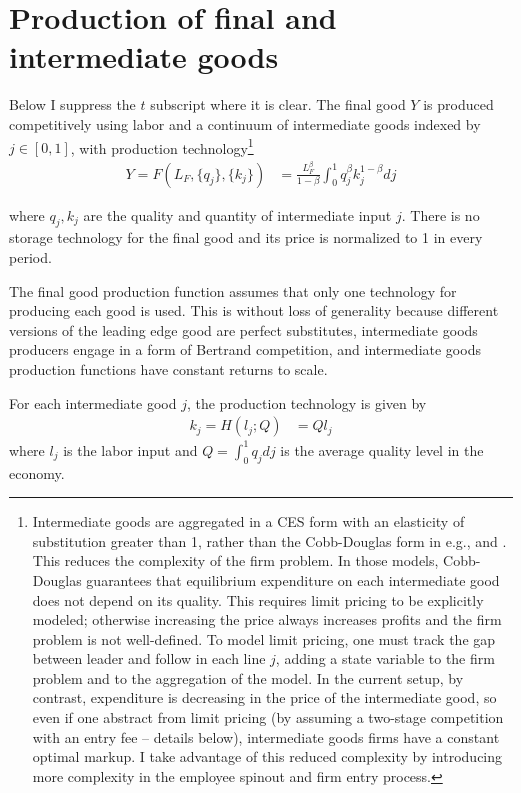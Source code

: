 \documentclass[12pt,english]{article}
\theoremstyle{remark}
\begin{document}
\section{Production of final and intermediate goods}

Below I suppress the $t$ subscript where it is clear. The final good $Y$ is produced competitively using labor and a continuum of intermediate goods indexed by $j \in [0,1]$, with production technology\footnote{Intermediate goods are aggregated in a CES form with an elasticity of substitution greater than 1, rather than the Cobb-Douglas form in e.g., \cite{grossman_quality_1991} and \cite{baslandze_spinout_2019}. This reduces the complexity of the firm problem. In those models, Cobb-Douglas guarantees that equilibrium expenditure on each intermediate good does not depend on its quality. This requires limit pricing to be explicitly modeled; otherwise increasing the price always increases profits and the firm problem is not well-defined. To model limit pricing, one must track the gap between leader and follow in each line $j$, adding a state variable to the firm problem and to the aggregation of the model. In the current setup, by contrast, expenditure is decreasing in the price of the intermediate good, so even if one abstract from limit pricing (by assuming a two-stage competition with an entry fee -- details below), intermediate goods firms have a constant optimal markup. I take advantage of this reduced complexity by introducing more complexity in the employee spinout and firm entry process.}
\begin{align}
Y = F(L_F,\{q_j\},\{k_j\}) &= \frac{L_F^{\beta}}{1-\beta} \int_0^1 q_j^{\beta} k_j^{1-\beta} dj \label{final_goods_production}
\end{align}

where $q_j,k_j$ are the quality and quantity of intermediate input $j$. 
There is no storage technology for the final good and its price is normalized to 1 in every period. 

The final good production function assumes that only one technology for producing each good is used. This is without loss of generality because different versions of the leading edge good are perfect substitutes, intermediate goods producers engage in a form of Bertrand competition, and intermediate goods production functions have constant returns to scale. 

For each intermediate good $j$, the production technology is given by
\begin{align*}
k_j = H(l_j;Q) &= Q l_j
\end{align*}
where $l_j$ is the labor input and $Q = \int_0^1 q_j dj$ is the average quality level in the economy. 
\end{document}
